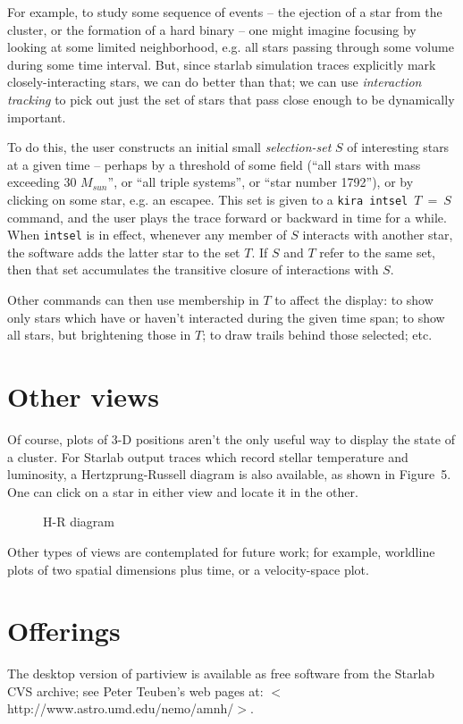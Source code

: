 For example, to study some sequence of events -- the ejection of a star
from the cluster, or the formation of a hard binary -- one might
imagine focusing by looking at some limited neighborhood,
e.g. all stars passing through some volume during some time interval.
But, since starlab simulation traces explicitly mark
closely-interacting stars, we can do better than that; we can 
use {\it interaction tracking} to pick out just the set of stars that
pass close enough to be dynamically important.

To do this, the user constructs an initial small
{\it selection-set} $S$ of interesting stars at a given time -- perhaps by
a threshold of some field (``all stars with mass exceeding 30 $M_{sun}$'', or
``all triple systems'', or ``star number 1792''), or by clicking on some star,
e.g. an escapee.  This set is given to a {\verb"kira intsel"}~$T$~=~$S$
command, and the user plays the trace forward or backward in time
for a while.  When {\verb"intsel"} is in effect, whenever any member of
$S$ interacts with another star, the software adds the latter star to the set $T$.
If $S$ and $T$ refer to the same set, then that set accumulates the transitive
closure of interactions with $S$.

Other commands can then use membership in $T$ to
affect the display: to show only stars which have
or haven't interacted during the given time span; to show all stars,
but brightening those in $T$; to draw trails behind those selected; etc.

\section{Other views}
Of course, plots of 3-D positions aren't the only
useful way to display the state of a cluster.  For Starlab output traces which
record stellar temperature and luminosity, a Hertzprung-Russell
diagram is also available, as shown in Figure~5.  One can click on a star
in either view and locate it in the other.

\begin{figure}
\caption{H-R diagram}
\end{figure}

Other types of views are contemplated for future work;
for example, worldline plots of two spatial dimensions plus time,
or a velocity-space plot.

\section{Offerings}
The desktop version of partiview is available as free software from
the Starlab CVS archive; see Peter Teuben's web pages at:\hfill\break
$<$http://www.astro.umd.edu/nemo/amnh/$>$.

